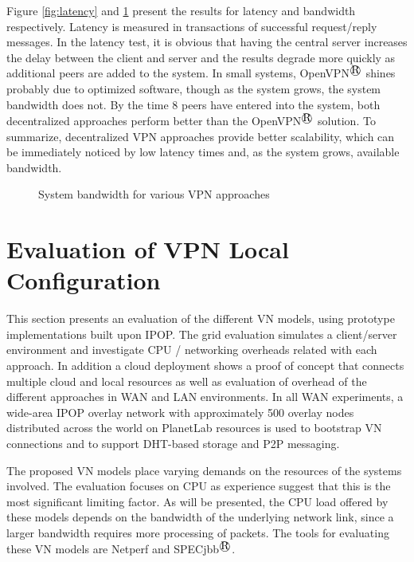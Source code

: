 Figure \ref{fig:latency} and \ref{fig:bandwidth} present the results for latency
and bandwidth respectively.  Latency is measured in transactions of successful
request/reply messages.  In the latency test, it is obvious that having the
central server increases the delay between the client and server and the results
degrade more quickly as additional peers are added to the system.  In small
systems, OpenVPN$^\registered$ shines probably due to optimized software, though as the system
grows, the system bandwidth does not.  By the time 8 peers have entered into
the system, both decentralized approaches perform better than the OpenVPN$^\registered$
solution.  To summarize, decentralized VPN approaches provide better
scalability, which can be immediately noticed by low latency times and, as the
system grows, available bandwidth.

\begin{figure}
\centering
{}
\caption{System bandwidth for various VPN approaches}
\label{fig:bandwidth}
\end{figure}

\section{Evaluation of VPN Local Configuration}

This section presents an evaluation of the different VN models, using prototype
implementations built upon IPOP.  The grid evaluation simulates a client/server
environment and investigate CPU / networking overheads related with each
approach.  In addition a cloud deployment shows a proof of concept that
connects multiple cloud and local resources as well as evaluation of overhead
of the different approaches in WAN and LAN environments.  In all WAN
experiments, a wide-area IPOP overlay network with approximately 500 overlay
nodes distributed across the world on PlanetLab resources is used to bootstrap
VN connections and to support DHT-based storage and P2P messaging.

The proposed VN models place varying demands on the resources of the systems
involved. The evaluation focuses on CPU as experience suggest that this is the
most significant limiting factor.  As will be presented, the CPU load offered
by these models depends on the bandwidth of the underlying network link, since
a larger bandwidth requires more processing of packets.  The tools for
evaluating these VN models are Netperf and SPECjbb$^\registered$.

